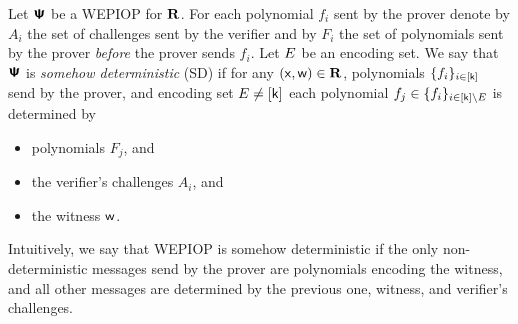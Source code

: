 \documentclass[runningheads,11pt]{llncs}
\begin{document}
\begin{definition}
  Let $\bm{\mathsf{\Psi}}$ be a WEPIOP for $\mathbf{R}$. For each polynomial $f_i$ sent by the prover
  denote by $A_i$ the set of challenges sent by the verifier and by $F_i$ the
  set of polynomials sent by the prover \emph{before} the prover sends
  $f_i$. Let $E$ be an encoding set. We say that $\bm{\mathsf{\Psi}}$ is \emph{somehow
    deterministic} (SD) if for any $(\mathsf{x}, \mathsf{w}) \in \mathbf{R}$, polynomials
  $\{f_i\}_{i \in [\mathsf{k}]}$ send by the prover, and encoding set
  $E \neq [\mathsf{k}]$ each polynomial
  $f_j \in \{f_i\}_{i \in [\mathsf{k}] \setminus E}$ is determined by
  \begin{itemize}
    \item polynomials $F_j$, and
    \item the verifier's challenges $A_i$, and
    \item the witness $\mathsf{w}$.
  \end{itemize}
\end{definition}
Intuitively, we say that WEPIOP is somehow deterministic if the only
non-deterministic messages send by the prover are polynomials encoding the
witness, and all other messages are determined by the previous one, witness, and
verifier's challenges.
\end{document}
